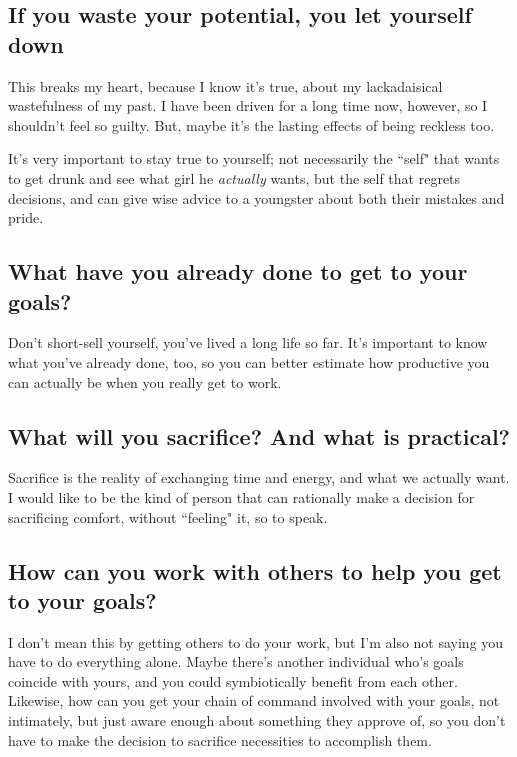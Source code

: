 \subsection{If you waste your potential, you let \textbf{yourself} down}

This breaks my heart, because I know it's true, about my lackadaisical wastefulness
of my past. I have been driven for a long time now, however, so I shouldn't feel so
guilty. But, maybe it's the lasting effects of being reckless too.

It's very important to stay true to yourself; not necessarily the ``self" that
wants to get drunk and see what girl he \textit{actually} wants, but the self
that regrets decisions, and can give wise advice to a youngster about both their
mistakes and pride.

\subsection{What have you already done to get to your goals?}

Don't short-sell yourself, you've lived a long life so far. It's important
to know what you've already done, too, so you can better estimate how productive you
can actually be when you really get to work.

\subsection{What will you sacrifice? And what is practical?}

Sacrifice is the reality of exchanging time and energy, and what we actually want.
I would like to be the kind of person that can rationally make a decision for
sacrificing comfort, without ``feeling" it, so to speak.

\subsection{How can you work with others to help you get to your goals?}

I don't mean this by getting others to do your work, but I'm also not
saying you have to do everything alone. Maybe there's another individual who's
goals coincide with yours, and you could symbiotically benefit from each other.
Likewise, how can you get your chain of command involved with your goals, not
intimately, but just aware enough about something they approve of, so you don't
have to make the decision to sacrifice necessities to accomplish them.

